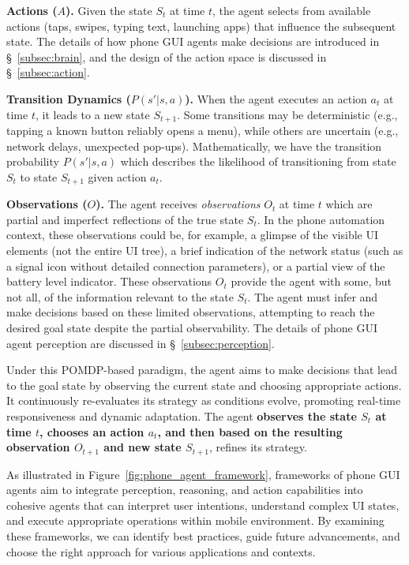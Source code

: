 \noindent\textbf{Actions ($A$).}
Given the state $S_t$ at time $t$, the agent selects from available actions (taps, swipes, typing text, launching apps) that influence the subsequent state.  The details of how phone GUI agents make decisions are introduced in \S\ \ref{subsec:brain}, and the design of the action space is discussed in \S\ \ref{subsec:action}.


\noindent\textbf{Transition Dynamics ($P(s'|s,a)$).}
When the agent executes an action $a_t$ at time $t$, it leads to a new state $S_{t+1}$. Some transitions may be deterministic (e.g., tapping a known button reliably opens a menu), while others are uncertain (e.g., network delays, unexpected pop-ups). Mathematically, we have the transition probability $P(s'|s,a)$ which describes the likelihood of transitioning from state $S_t$ to state $S_{t+1}$ given action $a_t$.



\noindent\textbf{Observations ($O$).}
The agent receives \textit{observations} $O_t$ at time $t$ which are partial and imperfect reflections of the true state $S_t$. In the phone automation context, these observations could be, for example, a glimpse of the visible UI elements (not the entire UI tree), a brief indication of the network status (such as a signal icon without detailed connection parameters), or a partial view of the battery level indicator. These observations $O_t$ provide the agent with some, but not all, of the information relevant to the state $S_t$. The agent must infer and make decisions based on these limited observations, attempting to reach the desired goal state despite the partial observability. The details of phone GUI agent perception are discussed in \S\ \ref{subsec:perception}.


Under this POMDP-based paradigm, the agent aims to make decisions that lead to the goal state by observing the current state and choosing appropriate actions. It continuously re-evaluates its strategy as conditions evolve, promoting real-time responsiveness and dynamic adaptation. The agent \textbf{observes the state $S_t$ at time $t$, chooses an action $a_t$, and then based on the resulting observation $O_{t+1}$ and new state $S_{t+1}$}, refines its strategy.

As illustrated in Figure~\ref{fig:phone_agent_framework}, frameworks of phone GUI agents aim to integrate perception, reasoning, and action capabilities into cohesive agents that can interpret user intentions, understand complex UI states, and execute appropriate operations within mobile environment. By examining these frameworks, we can identify best practices, guide future advancements, and choose the right approach for various applications and contexts.

